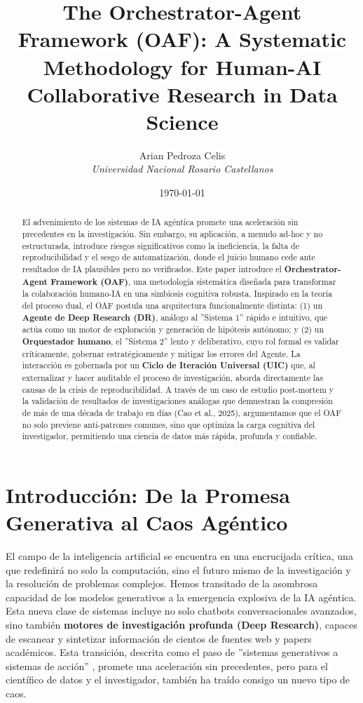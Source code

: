 \documentclass[11pt, a4paper]{article}
\title{The Orchestrator-Agent Framework (OAF): A Systematic Methodology for Human-AI Collaborative Research in Data Science}
\author{Arian Pedroza Celis \\ \textit{Universidad Nacional Rosario Castellanos}}
\date{\today}
\begin{document}
\maketitle

\begin{abstract}
\noindent
El advenimiento de los sistemas de IA agéntica promete una aceleración sin precedentes en la investigación. Sin embargo, su aplicación, a menudo ad-hoc y no estructurada, introduce riesgos significativos como la ineficiencia, la falta de reproducibilidad y el sesgo de automatización, donde el juicio humano cede ante resultados de IA plausibles pero no verificados. Este paper introduce el \textbf{Orchestrator-Agent Framework (OAF)}, una metodología sistemática diseñada para transformar la colaboración humano-IA en una simbiosis cognitiva robusta. Inspirado en la teoría del proceso dual, el OAF postula una arquitectura funcionalmente distinta: (1) un \textbf{Agente de Deep Research (DR)}, análogo al ''Sistema 1'' rápido e intuitivo, que actúa como un motor de exploración y generación de hipótesis autónomo; y (2) un \textbf{Orquestador humano}, el ''Sistema 2'' lento y deliberativo, cuyo rol formal es validar críticamente, gobernar estratégicamente y mitigar los errores del Agente. La interacción es gobernada por un \textbf{Ciclo de Iteración Universal (UIC)} que, al externalizar y hacer auditable el proceso de investigación, aborda directamente las causas de la crisis de reproducibilidad. A través de un caso de estudio post-mortem y la validación de resultados de investigaciones análogas que demuestran la compresión de más de una década de trabajo en días (Cao et al., 2025), argumentamos que el OAF no solo previene anti-patrones comunes, sino que optimiza la carga cognitiva del investigador, permitiendo una ciencia de datos más rápida, profunda y confiable.
\end{abstract}

\tableofcontents
\newpage


\section{Introducción: De la Promesa Generativa al Caos Agéntico}
\label{sec:introduccion}

El campo de la inteligencia artificial se encuentra en una encrucijada crítica, una que redefinirá no solo la computación, sino el futuro mismo de la investigación y la resolución de problemas complejos. Hemos transitado de la asombrosa capacidad de los modelos generativos a la emergencia explosiva de la IA agéntica. Esta nueva clase de sistemas incluye no solo chatbots conversacionales avanzados, sino también \textbf{motores de investigación profunda (Deep Research)}, capaces de escanear y sintetizar información de cientos de fuentes web y papers académicos. Esta transición, descrita como el paso de ''sistemas generativos a sistemas de acción'' \cite{xi2023}, promete una aceleración sin precedentes, pero para el científico de datos y el investigador, también ha traído consigo un nuevo tipo de caos.
\end{document}
